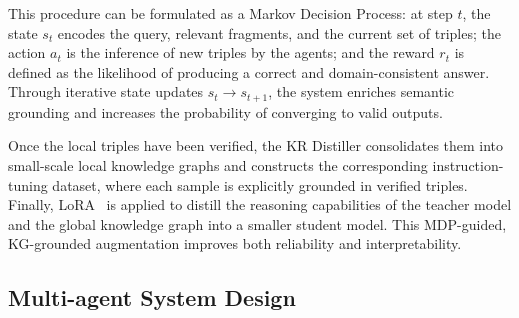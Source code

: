\documentclass[preprint,12pt]{elsarticle}
\def\textbf#1{#1}%
\begin{document}
This procedure can be formulated as a \textbf{Markov Decision Process}: at step $t$, the state $s_t$ encodes the query, relevant fragments, and the current set of triples; the action $a_t$ is the inference of new triples by the agents; and the reward $r_t$ is defined as the likelihood of producing a correct and domain-consistent answer. Through iterative state updates $s_t \rightarrow s_{t+1}$, the system enriches semantic grounding and increases the probability of converging to valid outputs.  

Once the local triples have been verified, the KR Distiller consolidates them into small-scale local knowledge graphs and constructs the corresponding instruction-tuning dataset, where each sample is explicitly grounded in verified triples. Finally, LoRA~\cite{Hu2021} is applied to distill the reasoning capabilities of the teacher model and the global knowledge graph into a smaller student model. This MDP-guided, KG-grounded augmentation improves both reliability and interpretability.  


\subsection{Multi-agent System Design}

\end{document}
